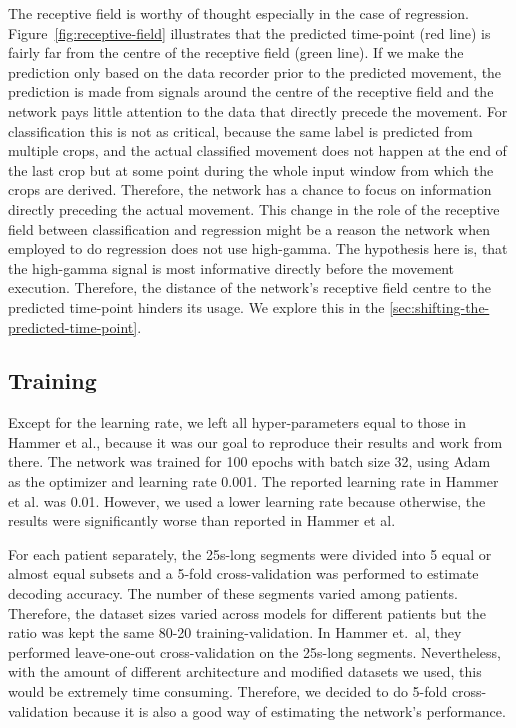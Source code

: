 The receptive field is worthy of thought especially in the case of regression.
Figure~\ref{fig:receptive-field} illustrates that the predicted time-point (red line) is fairly far from the centre of the receptive field (green line).
If we make the prediction only based on the data recorder prior to the predicted movement, the prediction is made from signals around the centre of the receptive field and the network pays little attention to the data that directly precede the movement.
For classification this is not as critical, because the same label is predicted from multiple crops, and the actual classified movement does not happen at the end of the last crop but at some point during the whole input window from which the crops are derived.
Therefore, the network has a chance to focus on information directly preceding the actual movement.
This change in the role of the receptive field between classification and regression might be a reason the network when employed to do regression does not use high-gamma.
The hypothesis here is, that the high-gamma signal is most informative directly before the movement execution.
Therefore, the distance of the network's receptive field centre to the predicted time-point hinders its usage.
We explore this in the \cref{sec:shifting-the-predicted-time-point}.

\subsection{Training}\label{subsec:training}
Except for the learning rate, we left all hyper-parameters equal to those in Hammer et al., because it was our goal to reproduce their results and work from there.
The network was trained for 100 epochs with batch size 32, using Adam~\cite{kingma-adam-2017} as the optimizer and learning rate 0.001.
The reported learning rate in Hammer et al. was 0.01.
However, we used a lower learning rate because otherwise, the results were significantly worse than reported in Hammer et al.

For each patient separately, the 25s-long segments were divided into 5 equal or almost equal subsets and a 5-fold cross-validation was performed to estimate decoding accuracy.
The number of these segments varied among patients.
Therefore, the dataset sizes varied across models for different patients but the ratio was kept the same 80-20 training-validation.
In Hammer et.\ al, they performed leave-one-out cross-validation on the 25s-long segments.
Nevertheless, with the amount of different architecture and modified datasets we used, this would be extremely time consuming.
Therefore, we decided to do 5-fold cross-validation because it is also a good way of estimating the network's performance.

